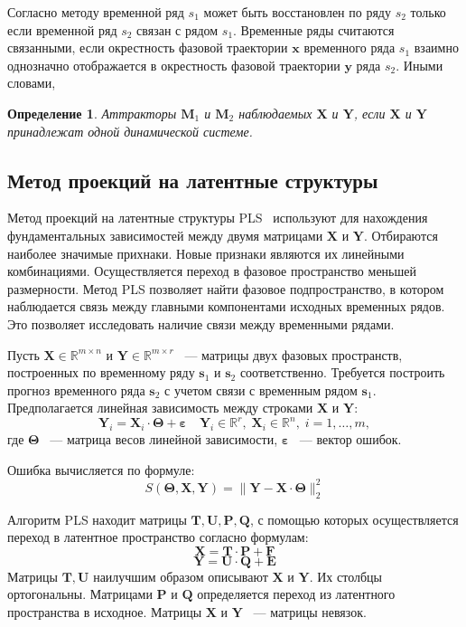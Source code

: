 \documentclass[12pt]{extarticle}
\newtheorem{definition}{Определение}
\newcommand{\bbr}{\mathbb{R}}
\begin{document}
Согласно методу временной ряд $s_1$ может быть восстановлен по ряду $s_2$ только если временной ряд $s_2$ связан с рядом $s_1$. Временные ряды считаются связанными, если окрестность фазовой траектории $\mathbf{x}$ временного ряда $s_1$ взаимно однозначно отображается в окрестность фазовой траектории $\mathbf{y}$ ряда $s_2$. Иными словами, 
\begin{definition}
Аттракторы $\mathbf{M}_1$ и $\mathbf{M}_2$ наблюдаемых $\mathbf{X}$ и $\mathbf{Y}$, если $\mathbf{X}$ и $\mathbf{Y}$ принадлежат одной динамической системе.
\end{definition}

\subsection{Метод проекций на латентные структуры}
Метод проекций на латентные структуры PLS~\cite{geladi1988notes, hoskuldsson1988pls} используют для нахождения фундаментальных зависимостей между двумя матрицами $\mathbf{X}$ и $\mathbf{Y}$. Отбираются наиболее значимые прихнаки. Новые признаки являются их линейными комбинациями. Осуществляется переход в фазовое пространство меньшей размерности. Метод PLS позволяет найти фазовое подпространство, в котором наблюдается связь между главными компонентами исходных временных рядов. Это позволяет исследовать наличие связи между временными рядами. 

Пусть $\mathbf{X}\in\bbr^{m\times n}$ и $\mathbf{Y}\in\bbr^{m\times r}$ ~--- матрицы двух фазовых пространств, построенных по временному ряду $\mathbf{s}_1$ и $\mathbf{s}_2$ соответственно. Требуется построить прогноз временного ряда $\mathbf{s}_2$ с учетом связи с временным рядом $\mathbf{s}_1$. Предполагается линейная зависимость между строками $\mathbf{X}$ и $\mathbf{Y}$:
\begin{equation}
    \mathbf{Y}_i = \mathbf{X}_i\cdot\mathbf{\Theta} + \boldsymbol{\varepsilon} \quad \mathbf{Y}_i\in\bbr^r,\;\mathbf{X}_i\in\bbr^n,\; i = 1,\ldots,m,
    \label{eq:linear}
\end{equation}
где $\mathbf{\Theta}$ ~--- матрица весов линейной зависимости,\; $\mathbf{\varepsilon}$ ~--- вектор ошибок.

Ошибка вычисляется по формуле:
\begin{equation}
    S(\mathbf{\Theta}, \mathbf{X}, \mathbf{Y}) = \|\mathbf{Y} - \mathbf{X}\cdot\mathbf{\Theta}\|_2^2
    \label{eq:error}
\end{equation}

Алгоритм PLS находит матрицы $\mathbf{T}, \mathbf{U}, \mathbf{P}, \mathbf{Q}$, с помощью которых осуществляется переход в латентное пространство согласно формулам:
\begin{equation}
    \mathbf{X} = \mathbf{T}\cdot \mathbf{P} + \mathbf{F}
\end{equation}
\[
    \mathbf{Y} = \mathbf{U}\cdot \mathbf{Q} + \mathbf{E}
    \label{eq:latent}
\]
Матрицы $\mathbf{T}, \mathbf{U}$ наилучшим образом описывают $\mathbf{X}$ и $\mathbf{Y}$. Их столбцы ортогональны. Матрицами $\mathbf{P}$ и $\mathbf{Q}$ определяется переход из латентного пространства в исходное. Матрицы $\mathbf{X}$ и $\mathbf{Y}$ ~--- матрицы невязок.
\end{document}
